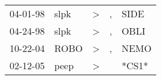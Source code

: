 \begin{supertabular}{lllll}
 04-01-98 &  slpk &  \textgreater &  , &   SIDE \\
 04-24-98 &  slpk &  \textgreater &  , &   OBLI \\
 10-22-04 &  ROBO &  \textgreater &  , &   NEMO \\
 02-12-05 &  peep &  \textgreater &    &  *CS1* \\
\end{supertabular}
